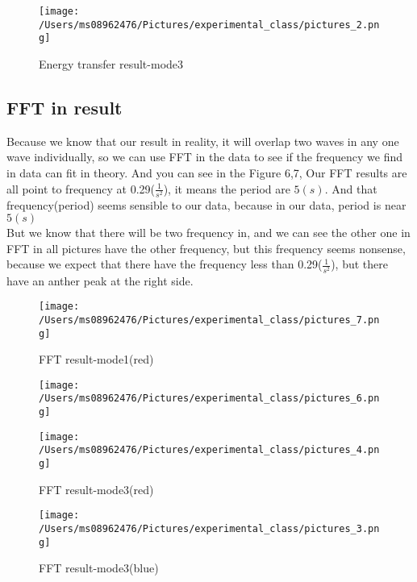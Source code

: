 \documentclass[final,1p,11pt]{elsarticle}
\begin{document}
\begin{figure}
\caption{Energy transfer result-mode3}
\centering
\texttt{[image: /Users/ms08962476/Pictures/experimental\_class/pictures\_2.png]}
\end{figure} 

\subsection{FFT in result}
Because we know that our result in reality, it will overlap two waves in any one wave individually, so we can use FFT in the data to see if the frequency we find in data can fit in theory. And you can see in the Figure 6,7, Our FFT results are all point to frequency at 0.29($\frac{1}{s^2}$), it means the period are $5(s)$.
And that frequency(period) seems sensible to our data, because in our data, period is near $5(s)$\\

But we know that there will be two frequency in, and we can see the other one in FFT in all pictures have the other frequency, but this frequency seems nonsense, because we expect that there have the frequency less than 0.29($\frac{1}{s^2}$), but there have an anther peak at the right side.\\   
\begin{figure}
\caption{FFT result-mode1(red)}
\centering
\texttt{[image: /Users/ms08962476/Pictures/experimental\_class/pictures\_7.png]}
\end{figure} 
\begin{figure}
\caption{FFT result-mode1(blue)}
\centering
\texttt{[image: /Users/ms08962476/Pictures/experimental\_class/pictures\_6.png]}
\begin{figure}
\end{figure} 
\caption{FFT result-mode3(red)}
\centering
\texttt{[image: /Users/ms08962476/Pictures/experimental\_class/pictures\_4.png]}
\end{figure} 
\begin{figure}
\caption{FFT result-mode3(blue)}
\centering
\texttt{[image: /Users/ms08962476/Pictures/experimental\_class/pictures\_3.png]}
\end{figure} 
\end{document}
